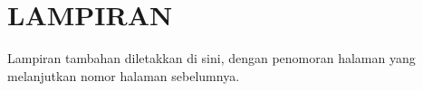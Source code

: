
\chapter*{LAMPIRAN}
Lampiran tambahan diletakkan di sini, dengan penomoran halaman yang
melanjutkan nomor halaman sebelumnya.
